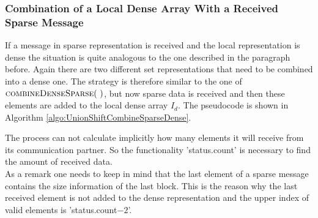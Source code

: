 \subsubsection{Combination of a Local Dense Array With a Received Sparse Message}
If a message in sparse representation is received and the local representation is dense  the situation is quite analogous to the one described in the paragraph before. Again there are two different set representations that need to be combined into a dense one. The strategy is therefore similar to the one of $\Call{combineDenseSparse}{~}$, but now  sparse data is received and then these elements are added to the local dense array $I_d$. The pseudocode is shown in Algorithm \ref{algo:UnionShiftCombineSparseDense}.
\begin{algorithm}[htb]
	\caption{Combine local dense array with a received sparse array.} \label{algo:UnionShiftCombineSparseDense}
	\begin{algorithmic}[1]
		\State  {}
			\State {}
		\EndFor
		\EndProcedure
	\end{algorithmic}
\end{algorithm}
The process can not calculate implicitly how many elements it will receive from its communication partner. So the functionality 'status.count' is necessary to find the amount of received data.\\
As a remark one needs to keep in mind that the last element of a sparse message contains the size information of the last block. This is the reason why the last received element is not added to the dense representation and the upper index of valid elements is 'status.count$-2$'.

